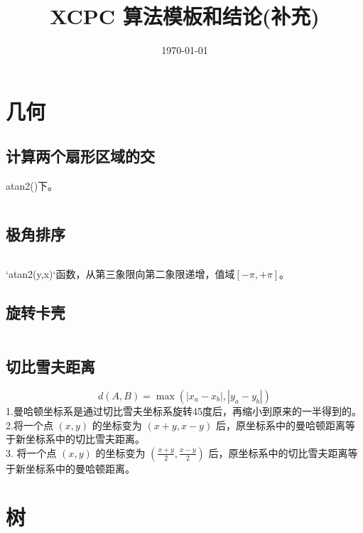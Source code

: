 \documentclass[titlepage, a4paper]{report}
\title{XCPC 算法模板和结论(补充)}
\date{\today}
\newcommand{\cppcode}[1]{  
    \inputminted[mathescape]{cpp}{source/#1}  
}
\begin{document}
\maketitle
\tableofcontents
\clearpage

\chapter{几何}

\section{计算两个扇形区域的交}
atan2()下。
\cppcode{ints.cpp}

\section{极角排序}
\cppcode{psort.cpp}
`atan2(y,x)`函数，从第三象限向第二象限递增，值域$[-\pi,+\pi]$。

\section{旋转卡壳}
\cppcode{旋转卡壳.cpp}

\section{切比雪夫距离}
$$
  d(A,B)=\max(|x_a-x_b|,|y_a-y_b|)
$$
1.曼哈顿坐标系是通过切比雪夫坐标系旋转45度后，再缩小到原来的一半得到的。\\
2.将一个点 $(x ,y)$ 的坐标变为 $(x + y, x -y)$ 后，原坐标系中的曼哈顿距离等于新坐标系中的切比雪夫距离。\\
3. 将一个点 $(x, y)$ 的坐标变为 $(\frac{x+y}{2},\frac{x-y}{2})$ 后，原坐标系中的切比雪夫距离等于新坐标系中的曼哈顿距离。\\




\chapter{树}
\end{document}
